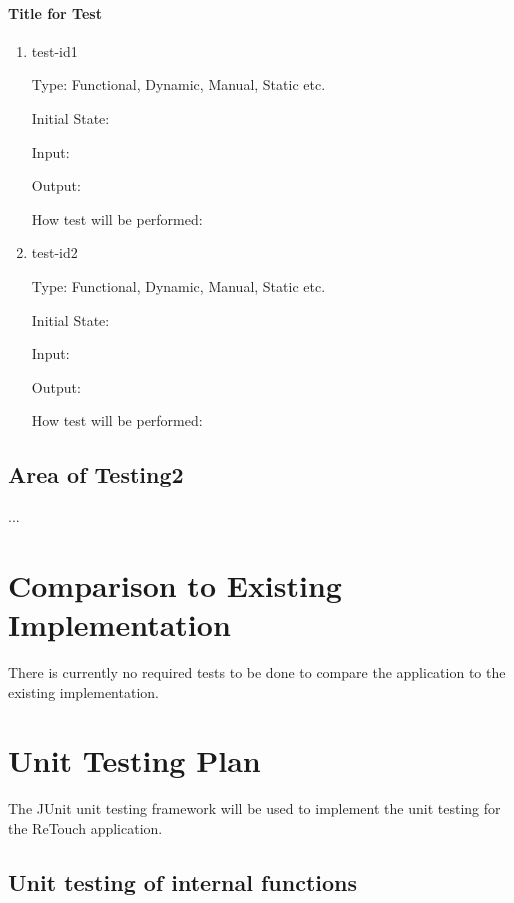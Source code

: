 \documentclass[12pt, titlepage]{article}
\begin{document}
\paragraph{Title for Test}

\begin{enumerate}

\item{test-id1\\}

Type: Functional, Dynamic, Manual, Static etc.
					
Initial State: 
					
Input: 
					
Output: 
					
How test will be performed: 
					
\item{test-id2\\}

Type: Functional, Dynamic, Manual, Static etc.
					
Initial State: 
					
Input: 
					
Output: 
					
How test will be performed: 

\end{enumerate}

\subsection{Area of Testing2}

...

	
\section{Comparison to Existing Implementation}	
There is currently no required tests to be done to compare the application to the existing implementation.
				
\section{Unit Testing Plan}

The JUnit unit testing framework will be used to implement the unit testing for the ReTouch application.
		
\subsection{Unit testing of internal functions}
\end{document}
